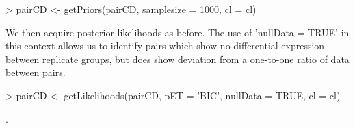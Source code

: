 \documentclass[a4paper]{article}
\begin{document}
\begin{Schunk}
\begin{Sinput}
> pairCD <- getPriors(pairCD, samplesize = 1000, cl = cl)
\end{Sinput}
\end{Schunk}

We then acquire posterior likelihoods as before. The use of 'nullData = TRUE' in this context allows us to identify pairs which show no differential expression between replicate groups, but does show deviation from a one-to-one ratio of data between pairs.

\begin{Schunk}
\begin{Sinput}
>   pairCD <- getLikelihoods(pairCD, pET = 'BIC', nullData = TRUE, cl = cl)
\end{Sinput}
\begin{Soutput}
.
\end{Soutput}
\end{Schunk}
\end{document}

